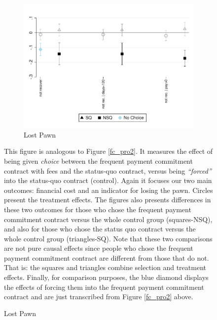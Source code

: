 \documentclass[oneside,11pt]{article}
\begin{document}
\begin{figure}[H]
\begin{center}
\begin{subfigure}{0.5\textwidth}
        \bigskip
        \bigskip
    
        \caption{Lost Pawn}
        \centering
        \includegraphics[width=\textwidth]{Figuras/def_te_pro_4.pdf}
    \end{subfigure}
    \end{center}
        \scriptsize
        This figure is analogous to Figure \ref{fc_pro2}. It measures the effect of being given \textit{choice} between the frequent payment commitment contract with fees and the status-quo contract, versus being \textit{``forced''} into the status-quo contract (control). Again it focuses our two main outcomes: financial cost and an indicator for losing the pawn. Circles present the treatment effects. The figures also presents differences in these two outcomes for those who chose the frequent payment commitment contract versus the whole control group (squares-NSQ), and also for those who chose the status quo contract versus the whole control group (triangles-SQ). Note that these two comparisons are not pure causal effects since people who chose the frequent payment commitment contract are different from those that do not. That is: the squares and triangles combine selection and treatment effects. Finally, for comparison purposes, the blue diamond displays the effects of forcing them into the frequent payment commitment contract and are just transcribed from Figure \ref{fc_pro2} above. 
\end{figure}
\end{document}
